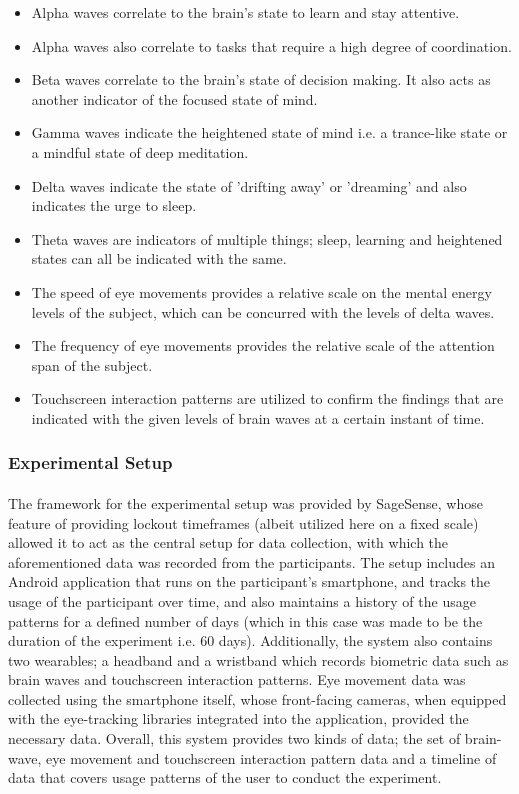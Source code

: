 \documentclass{article}
\begin{document}
\begin{itemize}
    \item Alpha waves correlate to the brain's state to learn and stay attentive.
    \item Alpha waves also correlate to tasks that require a high degree of coordination.
    \item Beta waves correlate to the brain's state of decision making.
	It also acts as another indicator of the focused state of mind.
    \item Gamma waves indicate the heightened state of mind i.e. a trance-like state or a mindful state of deep meditation.
    \item Delta waves indicate the state of 'drifting away' or 'dreaming' and also indicates the urge to sleep.
    \item Theta waves are indicators of multiple things; sleep, learning and heightened states can all be indicated with the same.
    \item The speed of eye movements provides a relative scale on the mental energy levels of the subject, which can be concurred with the levels of delta waves.
    \item The frequency of eye movements provides the relative scale of the attention span of the subject.
    \item Touchscreen interaction patterns are utilized to confirm the findings that are indicated with the given levels of brain waves at a certain instant of time.
\end{itemize}

\subsubsection{Experimental Setup}

\paragraph{} The framework for the experimental setup was provided by SageSense, whose feature of providing lockout timeframes (albeit utilized here on a fixed scale) allowed it to act as the central setup for data collection, with which the aforementioned data was recorded from the participants. The setup includes an Android application that runs on the participant's smartphone, and tracks the usage of the participant over time, and also maintains a history of the usage patterns for a defined number of days (which in this case was made to be the duration of the experiment i.e. 60 days). Additionally, the system also contains two wearables; a headband and a wristband which records biometric data such as brain waves and touchscreen interaction patterns. Eye movement data was collected using the smartphone itself, whose front-facing cameras, when equipped with the eye-tracking libraries integrated into the application, provided the necessary data. Overall, this system provides two kinds of data; the set of brain-wave, eye movement and touchscreen interaction pattern data and a timeline of data that covers usage patterns of the user to conduct the experiment.
\end{document}
